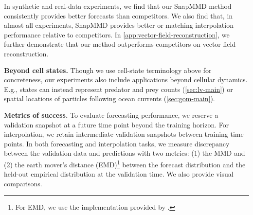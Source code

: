 In synthetic and real-data experiments,
we find that our SnapMMD method consistently provides better forecasts than competitors. We also find that, in almost all experiments, SnapMMD provides better or matching interpolation performance relative to competitors. In \cref{app:vector-field-reconstruction}, we further demonstrate that our method outperforms competitors on vector field reconstruction.

\textbf{Beyond cell states.} Though we use cell-state terminology above for concreteness, our experiments also include applications beyond cellular dynamics. E.g., states can instead represent predator and prey counts (\cref{sec:lv-main}) or spatial locations of particles following ocean currents (\cref{sec:gom-main}).

\textbf{Metrics of success.} To evaluate forecasting performance, we reserve a validation snapshot at a future time point beyond the training horizon.
For interpolation, we retain intermediate validation snapshots between training time points.
In both forecasting and interpolation tasks, we measure discrepancy between the validation data and predictions with two metrics: (1) the MMD and (2) the earth mover's distance (EMD)\footnote{For EMD, we use the implementation provided by \citet{trajnet}.} between the forecast distribution and the held-out empirical distribution at the validation time. We also provide visual comparisons.


